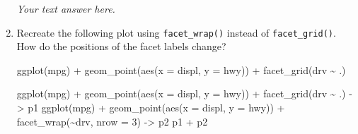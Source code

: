 \documentclass[
  letterpaper,
  DIV=11,
  numbers=noendperiod]{scrreprt}
\newenvironment{Shaded}{\begin{snugshade}}{\end{snugshade}}
\newcommand{\AttributeTok}[1]{\textcolor[rgb]{0.40,0.45,0.13}{#1}}
\newcommand{\DecValTok}[1]{\textcolor[rgb]{0.68,0.00,0.00}{#1}}
\newcommand{\FunctionTok}[1]{\textcolor[rgb]{0.28,0.35,0.67}{#1}}
\newcommand{\NormalTok}[1]{\textcolor[rgb]{0.00,0.23,0.31}{#1}}
\newcommand{\OtherTok}[1]{\textcolor[rgb]{0.00,0.23,0.31}{#1}}
\newcommand{\SpecialCharTok}[1]{\textcolor[rgb]{0.37,0.37,0.37}{#1}}
\begin{document}
\begin{enumerate}
\begin{tcolorbox}
\begin{figure}[H]
  \end{figure}

  \emph{Your text answer here.}

  \end{tcolorbox}
\item
  Recreate the following plot using \texttt{facet\_wrap()} instead of
  \texttt{facet\_grid()}. How do the positions of the facet labels
  change?

\begin{Shaded}
\begin{Highlighting}[]
\FunctionTok{ggplot}\NormalTok{(mpg) }\SpecialCharTok{+} 
  \FunctionTok{geom\_point}\NormalTok{(}\FunctionTok{aes}\NormalTok{(}\AttributeTok{x =}\NormalTok{ displ, }\AttributeTok{y =}\NormalTok{ hwy)) }\SpecialCharTok{+}
  \FunctionTok{facet\_grid}\NormalTok{(drv }\SpecialCharTok{\textasciitilde{}}\NormalTok{ .)}
\end{Highlighting}
\end{Shaded}

  \begin{tcolorbox}[enhanced jigsaw, breakable, bottomtitle=1mm, left=2mm, colback=white, toprule=.15mm, leftrule=.75mm, colframe=quarto-callout-note-color-frame, colbacktitle=quarto-callout-note-color!10!white, title={Answer}, coltitle=black, toptitle=1mm, bottomrule=.15mm, opacitybacktitle=0.6, arc=.35mm, rightrule=.15mm, titlerule=0mm, opacityback=0]

\begin{Shaded}
\begin{Highlighting}[]
\FunctionTok{ggplot}\NormalTok{(mpg) }\SpecialCharTok{+} 
  \FunctionTok{geom\_point}\NormalTok{(}\FunctionTok{aes}\NormalTok{(}\AttributeTok{x =}\NormalTok{ displ, }\AttributeTok{y =}\NormalTok{ hwy)) }\SpecialCharTok{+}
  \FunctionTok{facet\_grid}\NormalTok{(drv }\SpecialCharTok{\textasciitilde{}}\NormalTok{ .) }\OtherTok{{-}\textgreater{}}\NormalTok{ p1}
\FunctionTok{ggplot}\NormalTok{(mpg) }\SpecialCharTok{+} 
  \FunctionTok{geom\_point}\NormalTok{(}\FunctionTok{aes}\NormalTok{(}\AttributeTok{x =}\NormalTok{ displ, }\AttributeTok{y =}\NormalTok{ hwy)) }\SpecialCharTok{+}
  \FunctionTok{facet\_wrap}\NormalTok{(}\SpecialCharTok{\textasciitilde{}}\NormalTok{drv, }\AttributeTok{nrow =} \DecValTok{3}\NormalTok{) }\OtherTok{{-}\textgreater{}}\NormalTok{ p2}
\NormalTok{p1 }\SpecialCharTok{+}\NormalTok{ p2}
\end{Highlighting}
\end{Shaded}

  \begin{figure}[H]


\end{figure}
\end{tcolorbox}
\end{enumerate}
\end{document}
